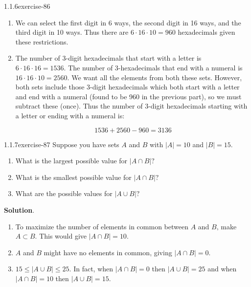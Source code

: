 \documentclass[twoside,11pt,]{book}
\numberwithin{equation}{chapter}
\newcommand{\card}[1]{\left| #1 \right|}
\begin{document}
\begin{divisionsolution}{1.1.6}{}{exercise-86}
\begin{enumerate}[label=(\alph*)]
\item\hypertarget{li-1018}{}\hypertarget{p-1370}{}%
We can select the first digit in 6 ways, the second digit in 16 ways, and the third digit in 10 ways. Thus there are \(6\cdot 16 \cdot 10 = 960\) hexadecimals given these restrictions.%
\item\hypertarget{li-1019}{}\hypertarget{p-1371}{}%
The number of 3-digit hexadecimals that start with a letter is \(6 \cdot 16 \cdot 16 = 1536\text{.}\) The number of 3-hexadecimals that end with a numeral is \(16 \cdot 16 \cdot 10 = 2560\text{.}\) We want all the elements from both these sets. However, both sets include those 3-digit hexadecimals which both start with a letter and end with a numeral (found to be 960 in the previous part), so we must subtract these (once). Thus the number of 3-digit hexadecimals starting with a letter or ending with a numeral is:%
\par
\hypertarget{p-1372}{}%
%
\begin{equation*}
1536 + 2560 - 960 = 3136
\end{equation*}
%
\end{enumerate}
%
\end{divisionsolution}%
\begin{divisionsolution}{1.1.7}{}{exercise-87}%
\hypertarget{p-1380}{}%
Suppose you have sets \(A\) and \(B\) with \(\card{A} = 10\) and \(\card{B} = 15\text{.}\)\leavevmode%
\begin{enumerate}[label=(\alph*)]
\item\hypertarget{li-1026}{}\hypertarget{p-1381}{}%
What is the largest possible value for \(\card{A \cap B}\text{?}\)%
\item\hypertarget{li-1027}{}\hypertarget{p-1383}{}%
What is the smallest possible value for \(\card{A \cap B}\text{?}\)%
\item\hypertarget{li-1028}{}\hypertarget{p-1385}{}%
What are the possible values for \(\card{A \cup B}\text{?}\)%
\end{enumerate}
%
\par\smallskip%
\noindent\textbf{Solution}.\quad%
\hypertarget{p-1386}{}%
\leavevmode%
\begin{enumerate}[label=(\alph*)]
\item\hypertarget{li-1029}{}\hypertarget{p-1387}{}%
To maximize the number of elements in common between \(A\) and \(B\text{,}\) make \(A \subset B\text{.}\) This would give \(\card{A \cap B} = 10\text{.}\)%
\item\hypertarget{li-1030}{}\hypertarget{p-1388}{}%
\(A\) and \(B\) might have no elements in common, giving \(\card{A\cap B} = 0\text{.}\)%
\item\hypertarget{li-1031}{}\hypertarget{p-1389}{}%
\(15 \le \card{A \cup B} \le 25\text{.}\) In fact, when \(\card{A \cap B} = 0\) then \(\card{A \cup B} = 25\) and when \(\card{A \cap B} = 10\) then \(\card{A \cup B} = 15\text{.}\)%
\end{enumerate}
%
\end{divisionsolution}%
\end{document}
